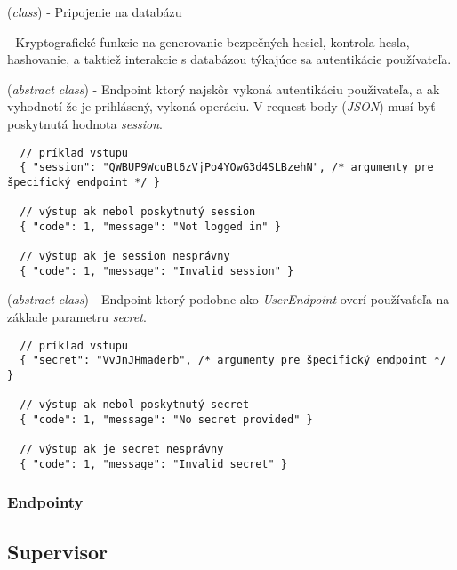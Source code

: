\documentclass{article}
\begin{document}
 (\emph{class}) - Pripojenie na databázu

 - Kryptografické funkcie na generovanie bezpečných hesiel, kontrola hesla, hashovanie, a taktiež interakcie s databázou týkajúce sa autentikácie používateľa.

 (\emph{abstract class}) - Endpoint ktorý najskôr vykoná autentikáciu použivateľa, a ak vyhodnotí že je prihlásený, vykoná operáciu. V request body (\emph{JSON}) musí byť poskytnutá hodnota \emph{session}.

\begin{verbatim}
  // príklad vstupu
  { "session": "QWBUP9WcuBt6zVjPo4YOwG3d4SLBzehN", /* argumenty pre špecifický endpoint */ }

  // výstup ak nebol poskytnutý session
  { "code": 1, "message": "Not logged in" }
  
  // výstup ak je session nesprávny
  { "code": 1, "message": "Invalid session" }
\end{verbatim}

 (\emph{abstract class}) - Endpoint ktorý podobne ako \emph{UserEndpoint} overí používaťeľa na základe parametru \emph{secret}.

\begin{verbatim}
  // príklad vstupu
  { "secret": "VvJnJHmaderb", /* argumenty pre špecifický endpoint */ }
  
  // výstup ak nebol poskytnutý secret
  { "code": 1, "message": "No secret provided" }
  
  // výstup ak je secret nesprávny
  { "code": 1, "message": "Invalid secret" }
\end{verbatim}

\subsubsection{Endpointy}



\subsection{Supervisor}
\end{document}
